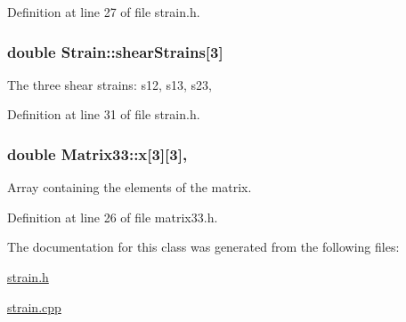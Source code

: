Definition at line 27 of file strain.\-h.

\hypertarget{classStrain_afbc4d1b573860bda614a43f767b8b272}{
\subsubsection[{shear\-Strains}]{\setlength{\rightskip}{0pt plus 5cm}double Strain\-::shear\-Strains\mbox{[}3\mbox{]}\hspace{0.3cm}{\ttfamily [protected]}}}\label{d1/d3c/classStrain_afbc4d1b573860bda614a43f767b8b272}
The three shear strains\-: s12, s13, s23, 

Definition at line 31 of file strain.\-h.

\hypertarget{classMatrix33_af7f01fa466616eb7c8eda2e4d9f85cdd}{
\subsubsection[{x}]{\setlength{\rightskip}{0pt plus 5cm}double Matrix33\-::x\mbox{[}3\mbox{]}\mbox{[}3\mbox{]}\hspace{0.3cm}{\ttfamily [protected]}, {\ttfamily [inherited]}}}\label{de/d82/classMatrix33_af7f01fa466616eb7c8eda2e4d9f85cdd}


Array containing the elements of the matrix. 



Definition at line 26 of file matrix33.\-h.



The documentation for this class was generated from the following files\-:\begin{DoxyCompactItemize}
\item 
\hyperlink{strain_8h}{strain.\-h}\item 
\hyperlink{strain_8cpp}{strain.\-cpp}\end{DoxyCompactItemize}
